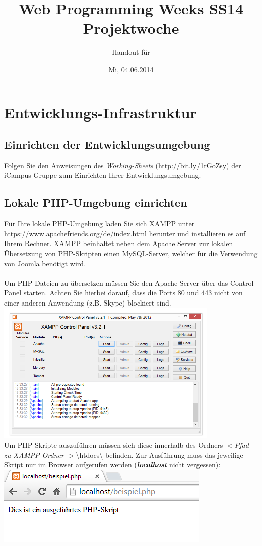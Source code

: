 \documentclass[]{article}
\date{Mi, 04.06.2014}
\title{Web Programming Weeks SS14 \\Projektwoche}
\author{Handout für}
\begin{document}
\maketitle

\section{Entwicklungs-Infrastruktur}
\subsection{Einrichten der Entwicklungsumgebung}
Folgen Sie den Anweisungen des \textit{Working-Sheets} (\url{http://bit.ly/1rGoZsy}) der iCampus-Gruppe zum Einrichten Ihrer Entwicklungsumgebung.
\subsection{Lokale PHP-Umgebung einrichten}
Für Ihre lokale PHP-Umgebung laden Sie sich XAMPP unter \url{https://www.apachefriends.org/de/index.html} herunter und installieren es auf Ihrem Rechner. XAMPP beinhaltet neben dem Apache Server zur lokalen Übersetzung von PHP-Skripten einen MySQL-Server, welcher für die Verwendung von Joomla benötigt wird.\\
\\
Um PHP-Dateien zu übersetzen müssen Sie den Apache-Server über das Control-Panel starten. Achten Sie hierbei darauf, dass die Ports 80 und 443 nicht von einer anderen Anwendung (z.B. Skype) blockiert sind.\\
\includegraphics[width=0.8\textwidth]{XAMPP_controlpanel}\\
Um PHP-Skripte auszuführen müssen sich diese innerhalb des Ordners \textit{$<$Pfad zu XAMPP-Ordner $>$}\textbackslash{}htdocs\textbackslash{} befinden. Zur Ausführung muss das jeweilige Skript nur im Browser aufgerufen werden (\textbf{\textit{localhost}} nicht vergessen):\\
\includegraphics{php_Script}
\end{document}
